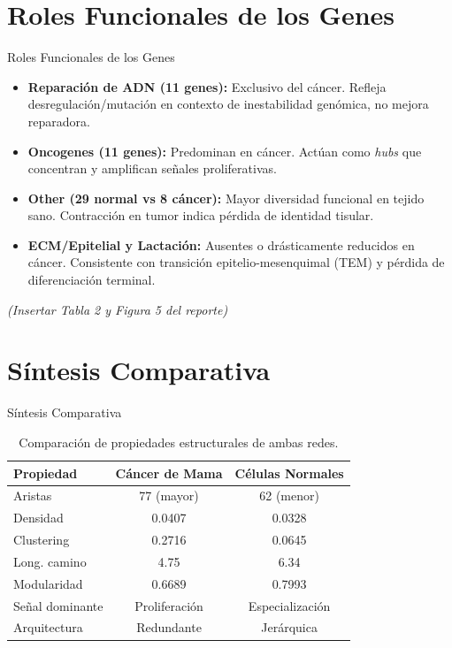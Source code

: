 \documentclass[12pt]{beamer}
\begin{document}
	\section{Roles Funcionales de los Genes}
	\begin{frame}{Roles Funcionales de los Genes}
		\begin{itemize}
			\item \textbf{Reparación de ADN (11 genes):} Exclusivo del cáncer. Refleja desregulación/mutación en contexto de inestabilidad genómica, no mejora reparadora.
			\item \textbf{Oncogenes (11 genes):} Predominan en cáncer. Actúan como \textit{hubs} que concentran y amplifican señales proliferativas.
			\item \textbf{Other (29 normal vs 8 cáncer):} Mayor diversidad funcional en tejido sano. Contracción en tumor indica pérdida de identidad tisular.
			\item \textbf{ECM/Epitelial y Lactación:} Ausentes o drásticamente reducidos en cáncer. Consistente con transición epitelio-mesenquimal (TEM) y pérdida de diferenciación terminal.
		\end{itemize}
		\centering \footnotesize \textit{(Insertar Tabla 2 y Figura 5 del reporte)}
	\end{frame}
	
	\section{Síntesis Comparativa}
	\begin{frame}{Síntesis Comparativa}
		\begin{table}
			\centering
			\small
			\begin{tabular}{lcc}
				\toprule
				\textbf{Propiedad} & \textbf{Cáncer de Mama} & \textbf{Células Normales} \\
				\midrule
				Aristas & 77 (mayor) & 62 (menor) \\
				Densidad & 0.0407 & 0.0328 \\
				Clustering & 0.2716 & 0.0645 \\
				Long. camino & 4.75 & 6.34 \\
				Modularidad & 0.6689 & 0.7993 \\
				Señal dominante & Proliferación & Especialización \\
				Arquitectura & Redundante & Jerárquica \\
				\bottomrule
			\end{tabular}
			\caption{Comparación de propiedades estructurales de ambas redes.}
		\end{table}
	\end{frame}
	
\end{document}
